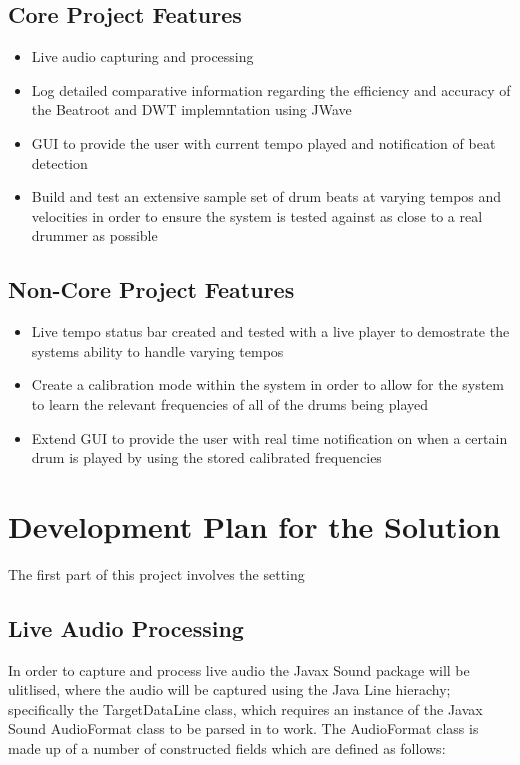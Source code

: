 \documentclass[a4paper, 11pt]{article}
\begin{document}
\subsection{Core Project Features}
\begin{itemize}
\item Live audio capturing and processing
\item Log detailed comparative information regarding the efficiency and accuracy of the Beatroot and DWT implemntation using JWave
\item GUI to provide the user with current tempo played and notification of beat detection
\item Build and test an extensive sample set of drum beats at varying tempos and velocities in order to ensure the system is tested against as close to a real drummer as possible
\end{itemize}

\subsection{Non-Core Project Features}
\begin{itemize}
\item Live tempo status bar created and tested with a live player to demostrate the systems ability to handle varying tempos
\item Create a calibration mode within the system in order to allow for the system to learn the relevant frequencies of all of the drums being played
\item Extend GUI to provide the user with real time notification on when a certain drum is played by using the stored calibrated frequencies
\end{itemize}

\maketitle{} 
\section{Development Plan for the Solution}

The first part of this project involves the setting 

\subsection{Live Audio Processing}
In order to capture and process live audio the Javax Sound package will be ulitlised, where the audio will be captured using the Java Line hierachy; specifically the TargetDataLine class, which requires an instance of the Javax Sound AudioFormat class to be parsed in to work. The AudioFormat class is made up of a number of constructed fields which are defined as follows:
\end{document}
